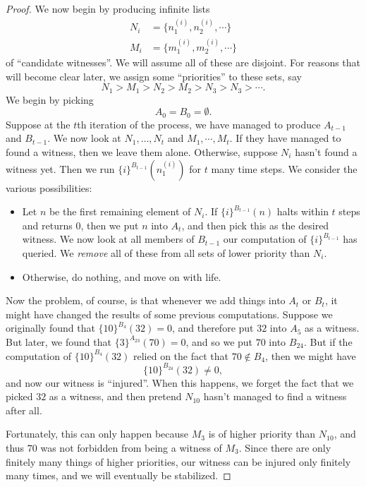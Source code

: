 \documentclass[a4paper]{article}
\begin{document}
\begin{proof}
  We now begin by producing infinite lists
  \begin{align*}
    N_i &= \{n_1^{(i)}, n_2^{(i)}, \cdots\}\\
    M_i &= \{m_1^{(i)}, m_2^{(i)}, \cdots\}
  \end{align*}
  of ``candidate witnesses''. We will assume all of these are disjoint. For reasons that will become clear later, we assign some ``priorities'' to these sets, say
  \[
    N_1 > M_1 > N_2 > M_2 > N_3 > N_3 > \cdots.
  \]
  We begin by picking
  \[
    A_0 = B_0 = \emptyset.
  \]
  Suppose at the $t$th iteration of the process, we have managed to produce $A_{t - 1}$ and $B_{t - 1}$. We now look at $N_1, \ldots, N_t$ and $M_1, \cdots, M_t$. If they have managed to found a witness, then we leave them alone. Otherwise, suppose $N_i$ hasn't found a witness yet. Then we run $\{i\}^{B_{t - 1}}(n^{(i)}_1)$ for $t$ many time steps. We consider the various possibilities:
  \begin{itemize}
    \item Let $n$ be the first remaining element of $N_i$. If $\{i\}^{B_{t - 1}}(n)$ halts within $t$ steps and returns $0$, then we put $n$ into $A_t$, and then pick this as the desired witness. We now look at all members of $B_{t - 1}$ our computation of $\{i\}^{B_{t - 1}}$ has queried. We \emph{remove} all of these from all sets of lower priority than $N_i$.
    \item Otherwise, do nothing, and move on with life.
  \end{itemize}
  Now the problem, of course, is that whenever we add things into $A_t$ or $B_t$, it might have changed the results of some previous computations. Suppose we originally found that $\{10\}^{B_4}(32) = 0$, and therefore put $32$ into $A_5$ as a witness. But later, we found that $\{3\}^{A_{23}}(70) = 0$, and so we put $70$ into $B_{24}$. But if the computation of $\{10\}^{B_4}(32)$ relied on the fact that $70\not\in B_4$, then we might have
  \[
    \{10\}^{B_{24}}(32) \not= 0,
  \]
  and now our witness is ``injured''. When this happens, we forget the fact that we picked $32$ as a witness, and then pretend $N_{10}$ hasn't managed to find a witness after all.

  Fortunately, this can only happen because $M_3$ is of higher priority than $N_{10}$, and thus $70$ was not forbidden from being a witness of $M_3$. Since there are only finitely many things of higher priorities, our witness can be injured only finitely many times, and we will eventually be stabilized.


\end{proof}
\end{document}
